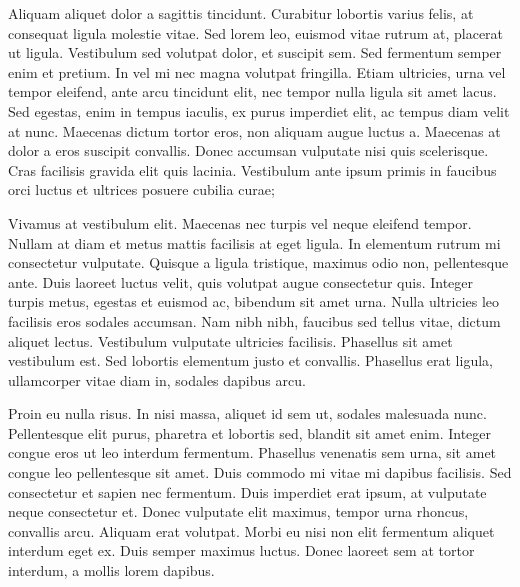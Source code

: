 \documentclass{book}
\begin{document}
            Aliquam aliquet dolor a sagittis tincidunt. Curabitur lobortis varius felis, at
               consequat ligula molestie vitae. Sed lorem leo, euismod vitae rutrum at, placerat ut
               ligula. Vestibulum sed volutpat dolor, et suscipit sem. Sed fermentum semper enim et
               pretium. In vel mi nec magna volutpat fringilla. Etiam ultricies, urna vel tempor
               eleifend, ante arcu tincidunt elit, nec tempor nulla ligula sit amet lacus. Sed
               egestas, enim in tempus iaculis, ex purus imperdiet elit, ac tempus diam velit at
               nunc. Maecenas dictum tortor eros, non aliquam augue luctus a. Maecenas at dolor a
               eros suscipit convallis. Donec accumsan vulputate nisi quis scelerisque. Cras
               facilisis gravida elit quis lacinia. Vestibulum ante ipsum primis in faucibus orci
               luctus et ultrices posuere cubilia curae;
            
            Vivamus at vestibulum elit. Maecenas nec turpis vel neque eleifend tempor. Nullam at
               diam et metus mattis facilisis at eget ligula. In elementum rutrum mi consectetur
               vulputate. Quisque a ligula tristique, maximus odio non, pellentesque ante. Duis
               laoreet luctus velit, quis volutpat augue consectetur quis. Integer turpis metus,
               egestas et euismod ac, bibendum sit amet urna. Nulla ultricies leo facilisis eros
               sodales accumsan. Nam nibh nibh, faucibus sed tellus vitae, dictum aliquet lectus.
               Vestibulum vulputate ultricies facilisis. Phasellus sit amet vestibulum est. Sed
               lobortis elementum justo et convallis. Phasellus erat ligula, ullamcorper vitae diam
               in, sodales dapibus arcu.
            
            Proin eu nulla risus. In nisi massa, aliquet id sem ut, sodales malesuada nunc.
               Pellentesque elit purus, pharetra et lobortis sed, blandit sit amet enim. Integer
               congue eros ut leo interdum fermentum. Phasellus venenatis sem urna, sit amet congue
               leo pellentesque sit amet. Duis commodo mi vitae mi dapibus facilisis. Sed
               consectetur et sapien nec fermentum. Duis imperdiet erat ipsum, at vulputate neque
               consectetur et. Donec vulputate elit maximus, tempor urna rhoncus, convallis arcu.
               Aliquam erat volutpat. Morbi eu nisi non elit fermentum aliquet interdum eget ex.
               Duis semper maximus luctus. Donec laoreet sem at tortor interdum, a mollis lorem
               dapibus.
            
\end{document}
